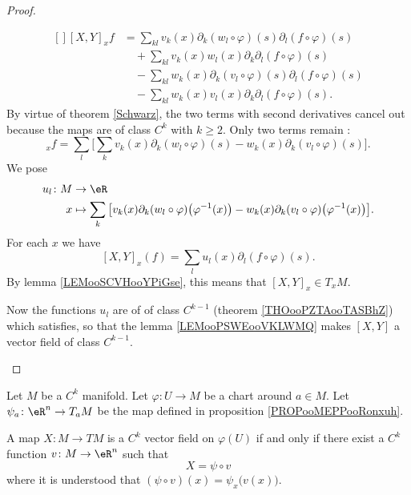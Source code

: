 \begin{proof}
\begin{subproof}
		\begin{equation}
			\begin{aligned}[]
				[X,Y]_xf & =\sum_{kl}v_k(x)\partial_k(w_l\circ\varphi)(s)\partial_l(f\circ\varphi)(s)       \\
				         & \quad+\sum_{kl}v_k(x)w_l(x)\partial_k\partial_l(f\circ\varphi)(s)                \\
				         & \quad -\sum_{kl}w_k(x)\partial_k(v_l\circ\varphi)(s)\partial_l(f\circ\varphi)(s) \\
				         & \quad -\sum_{kl}w_k(x)v_l(x)\partial_k\partial_l(f\circ\varphi)(s).
			\end{aligned}
		\end{equation}
		By virtue of theorem \ref{Schwarz}, the two terms with second derivatives cancel out because the maps are of class \( C^k\) with \( k\geq 2\). Only two terms remain :
		\begin{equation}
			[X,Y]_xf=\sum_l\big[ \sum_kv_k(x)\partial_k(w_l\circ\varphi)(s)-w_k(x)\partial_k(v_l\circ\varphi)(s) \big].
		\end{equation}
		We pose
		\begin{equation}
			\begin{aligned}
				u_l\colon M & \to \eR                                                                                                                                               \\
				x           & \mapsto  \sum_k\big[ v_k(x)\partial_k(w_l\circ\varphi)\big( \varphi^{-1}(x) \big)-w_k(x)\partial_k(v_l\circ\varphi)\big( \varphi^{-1}(x) \big) \big].
			\end{aligned}
		\end{equation}
		For each \( x\) we have
		\begin{equation}        \label{EQooVUOKooAyGoae}
			[X,Y]_x(f)=\sum_lu_l(x)\partial_l(f\circ\varphi)(s).
		\end{equation}
		By lemma \ref{LEMooSCVHooYPiGse}, this means that \( [X,Y]_x\in T_xM\).

		\spitem[\ref{ITEMooPGPLooQrKxWY}]

		Now the functions \( u_l\) are of of class \( C^{k-1}\) (theorem \ref{THOooPZTAooTASBhZ}) which satisfies, so that the lemma \ref{LEMooPSWEooVKLWMQ} makes \( [X,Y] \) a vector field of class \( C^{k-1}\).
	\end{subproof}
\end{proof}

\begin{lemma}       \label{LEMooPWMUooRalWxC}
	Let \( M\) be a \( C^k\) manifold. Let \( \varphi\colon U\to M\) be a chart around \( a\in M\). Let \( \psi_a\colon \eR^n\to T_aM \) be the map defined in proposition \ref{PROPooMEPPooRonxuh}.

	A map \( X\colon M\to TM\) is a \( C^k\) vector field on \( \varphi(U)\) if and only if there exist a \( C^k\) function \( v\colon M\to \eR^n\) such that
	\begin{equation}
		X=\psi\circ v
	\end{equation}
	where it is understood that \( (\psi\circ v)(x)=\psi_x\big( v(x) \big)\).
\end{lemma}


